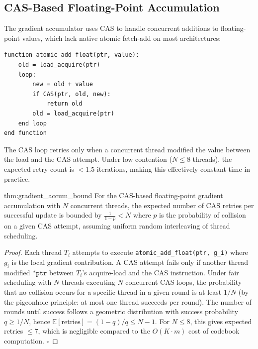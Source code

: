 \subsection{CAS-Based Floating-Point Accumulation}

The gradient accumulator uses CAS to handle concurrent additions to floating-point values, which lack native atomic fetch-add on most architectures:

\begin{lstlisting}[language={},caption={Lock-free floating-point accumulation via CAS}]
function atomic_add_float(ptr, value):
    old = load_acquire(ptr)
    loop:
        new = old + value
        if CAS(ptr, old, new):
            return old
        old = load_acquire(ptr)
    end loop
end function
\end{lstlisting}

The CAS loop retries only when a concurrent thread modified the value between the load and the CAS attempt. Under low contention ($N \leq 8$ threads), the expected retry count is $< 1.5$ iterations, making this effectively constant-time in practice.

\begin{mythm}{thm:gradient_accum_bound}
For the CAS-based floating-point gradient accumulation with $N$ concurrent threads, the expected number of CAS retries per successful update is bounded by $\frac{1}{1 - p} < N$ where $p$ is the probability of collision on a given CAS attempt, assuming uniform random interleaving of thread scheduling.
\end{mythm}

\begin{proof}
Each thread $T_i$ attempts to execute \texttt{atomic\_add\_float(ptr, g_i)} where $g_i$ is the local gradient contribution. A CAS attempt fails only if another thread modified $\texttt{*ptr}$ between $T_i$'s acquire-load and the CAS instruction. Under fair scheduling with $N$ threads executing $N$ concurrent CAS loops, the probability that no collision occurs for a specific thread in a given round is at least $1/N$ (by the pigeonhole principle: at most one thread succeeds per round). The number of rounds until success follows a geometric distribution with success probability $q \geq 1/N$, hence $\mathbb{E}[\text{retries}] = (1-q)/q \leq N-1$. For $N \leq 8$, this gives expected retries $\leq 7$, which is negligible compared to the $O(K \cdot m)$ cost of codebook computation. $\square$
\end{proof}

